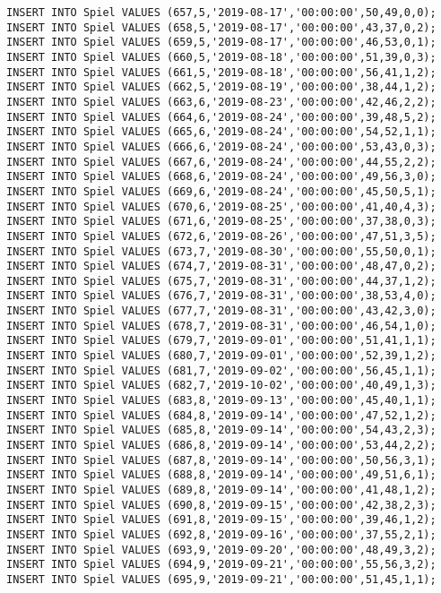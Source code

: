 \documentclass{bschlangaul-aufgabe}
\begin{document}
\begin{verbatim}
INSERT INTO Spiel VALUES (657,5,'2019-08-17','00:00:00',50,49,0,0);
INSERT INTO Spiel VALUES (658,5,'2019-08-17','00:00:00',43,37,0,2);
INSERT INTO Spiel VALUES (659,5,'2019-08-17','00:00:00',46,53,0,1);
INSERT INTO Spiel VALUES (660,5,'2019-08-18','00:00:00',51,39,0,3);
INSERT INTO Spiel VALUES (661,5,'2019-08-18','00:00:00',56,41,1,2);
INSERT INTO Spiel VALUES (662,5,'2019-08-19','00:00:00',38,44,1,2);
INSERT INTO Spiel VALUES (663,6,'2019-08-23','00:00:00',42,46,2,2);
INSERT INTO Spiel VALUES (664,6,'2019-08-24','00:00:00',39,48,5,2);
INSERT INTO Spiel VALUES (665,6,'2019-08-24','00:00:00',54,52,1,1);
INSERT INTO Spiel VALUES (666,6,'2019-08-24','00:00:00',53,43,0,3);
INSERT INTO Spiel VALUES (667,6,'2019-08-24','00:00:00',44,55,2,2);
INSERT INTO Spiel VALUES (668,6,'2019-08-24','00:00:00',49,56,3,0);
INSERT INTO Spiel VALUES (669,6,'2019-08-24','00:00:00',45,50,5,1);
INSERT INTO Spiel VALUES (670,6,'2019-08-25','00:00:00',41,40,4,3);
INSERT INTO Spiel VALUES (671,6,'2019-08-25','00:00:00',37,38,0,3);
INSERT INTO Spiel VALUES (672,6,'2019-08-26','00:00:00',47,51,3,5);
INSERT INTO Spiel VALUES (673,7,'2019-08-30','00:00:00',55,50,0,1);
INSERT INTO Spiel VALUES (674,7,'2019-08-31','00:00:00',48,47,0,2);
INSERT INTO Spiel VALUES (675,7,'2019-08-31','00:00:00',44,37,1,2);
INSERT INTO Spiel VALUES (676,7,'2019-08-31','00:00:00',38,53,4,0);
INSERT INTO Spiel VALUES (677,7,'2019-08-31','00:00:00',43,42,3,0);
INSERT INTO Spiel VALUES (678,7,'2019-08-31','00:00:00',46,54,1,0);
INSERT INTO Spiel VALUES (679,7,'2019-09-01','00:00:00',51,41,1,1);
INSERT INTO Spiel VALUES (680,7,'2019-09-01','00:00:00',52,39,1,2);
INSERT INTO Spiel VALUES (681,7,'2019-09-02','00:00:00',56,45,1,1);
INSERT INTO Spiel VALUES (682,7,'2019-10-02','00:00:00',40,49,1,3);
INSERT INTO Spiel VALUES (683,8,'2019-09-13','00:00:00',45,40,1,1);
INSERT INTO Spiel VALUES (684,8,'2019-09-14','00:00:00',47,52,1,2);
INSERT INTO Spiel VALUES (685,8,'2019-09-14','00:00:00',54,43,2,3);
INSERT INTO Spiel VALUES (686,8,'2019-09-14','00:00:00',53,44,2,2);
INSERT INTO Spiel VALUES (687,8,'2019-09-14','00:00:00',50,56,3,1);
INSERT INTO Spiel VALUES (688,8,'2019-09-14','00:00:00',49,51,6,1);
INSERT INTO Spiel VALUES (689,8,'2019-09-14','00:00:00',41,48,1,2);
INSERT INTO Spiel VALUES (690,8,'2019-09-15','00:00:00',42,38,2,3);
INSERT INTO Spiel VALUES (691,8,'2019-09-15','00:00:00',39,46,1,2);
INSERT INTO Spiel VALUES (692,8,'2019-09-16','00:00:00',37,55,2,1);
INSERT INTO Spiel VALUES (693,9,'2019-09-20','00:00:00',48,49,3,2);
INSERT INTO Spiel VALUES (694,9,'2019-09-21','00:00:00',55,56,3,2);
INSERT INTO Spiel VALUES (695,9,'2019-09-21','00:00:00',51,45,1,1);

\end{verbatim}
\end{document}
